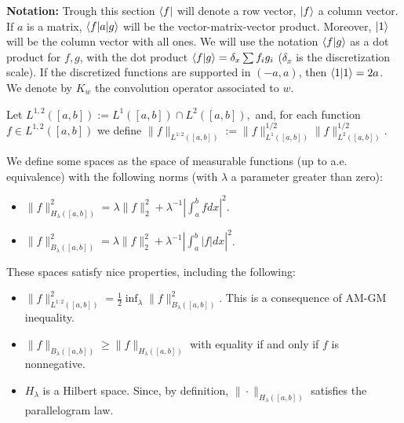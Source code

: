 \textbf{Notation:} Trough this section $\langle f |$ will denote a row vector, $| f \rangle$ a column vector. If $a$ is a matrix, $\langle f | a | g \rangle$ will be the vector-matrix-vector product. Moreover, $| 1 \rangle$ will be the column vector with all ones. We will use the notation $\langle f | g \rangle$ as a dot product for $f,g$, with the dot product $\langle f | g \rangle = \delta_x \sum f_i g_i$ ($\delta_x$ is the discretization scale). If the discretized functions are supported in $(-a,a)$, then $\langle 1 | 1 \rangle = 2a$. We denote by $K_w$ the convolution operator associated to $w$.

Let 
$
L^{1,2}([a,b]):= L^{1}([a,b])\cap L^{2}([a,b]),$ and, for each function $f\in L^{1,2}([a,b])$ we define
$\|f\|_{L^{1:2}([a,b])} := \|f\|^{1/2}_{L^1([a,b])}\|f\|^{1/2}_{L^2([a,b])}$.

\begin{definition}
We define some spaces as the space of measurable functions (up to a.e. equivalence) with the following norms (with $\lambda$ a parameter greater than zero):

\begin{itemize}
    \item $\|f\|_{H_\lambda([a,b])}^{2} = \lambda\|f\|_2^2+\lambda^{-1}\left|\int_a^b f dx \right|^2$.
    \item $\|f\|_{B_\lambda([a,b])}^{2} = \lambda\|f\|_2^2+\lambda^{-1}\left|\int_a^b |f| dx \right|^2$.
\end{itemize}
These spaces satisfy nice properties, including the following:
\begin{itemize}
    \item $\|f\|^2_{L^{1:2}([a,b])} = \frac 1 2 \inf_{\lambda} \|f\|^2_{B_{\lambda}([a,b])}$. This is a consequence of AM-GM inequality.
    \item $ \|f\|_{B_{\lambda}([a,b])} \ge \|f\|_{H_{\lambda}([a,b])}$ with equality if and only if $f$ is nonnegative.
    \item $H_{\lambda}$ is a Hilbert space. Since, by definition, $\|\cdot\|_{H_{\lambda}([a,b])}$ satisfies the parallelogram law.
\end{itemize}
\end{definition}
